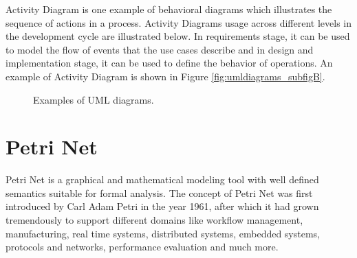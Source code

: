 Activity Diagram is one example of behavioral diagrams which illustrates the sequence of actions in a process. Activity Diagrams usage across different levels in the development cycle are illustrated below. In requirements stage, it can be used to model the flow of events that the use cases describe and in design and implementation stage, it can be used to define the behavior of operations. An example of Activity Diagram is shown in Figure \ref{fig:umldiagrams_subfigB}.

\begin{figure}[htb!]
  \centering
	\caption{Examples of UML diagrams.}
\label{fig:umldiagrams}
\end{figure}

\section{Petri Net}
Petri Net is a graphical and mathematical modeling tool with well defined semantics suitable for formal analysis. The concept of Petri Net was first introduced by Carl Adam Petri in the year 1961, after which it had grown tremendously to support different domains like workflow management, manufacturing, real time systems, distributed systems, embedded systems, protocols and networks, performance evaluation and much more.
 
